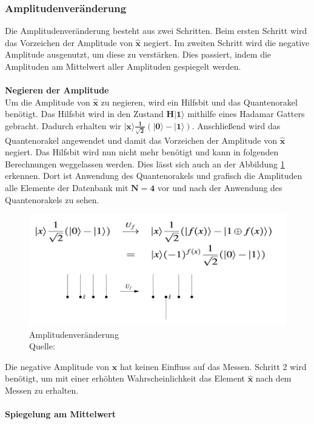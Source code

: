 \subsubsection{Amplitudenveränderung}
Die Amplitudenveränderung besteht aus zwei Schritten. Beim ersten Schritt wird das Vorzeichen der Amplitude von $\mathbf{\hat x}$ negiert. Im zweiten Schritt wird die negative Amplitude ausgenutzt, um diese zu verstärken. Dies passiert, indem die Amplituden am Mittelwert aller Amplituden gespiegelt werden. 
\\ \\
\textbf{Negieren der Amplitude}
\\
Um die Amplitude von $\mathbf{\hat x}$ zu negieren, wird ein Hilfsbit und das Quantenorakel benötigt. Das Hilfsbit wird in den Zustand $\mathbf{H|1\rangle}$ mithilfe eines Hadamar Gatters gebracht. Dadurch erhalten wir $\mathbf{|x\rangle \frac{1}{\sqrt 2}(|0\rangle - |1\rangle )}$. Anschließend wird das Quantenorakel angewendet und damit das Vorzeichen der Amplitude von $\mathbf{\hat{x}}$ negiert. Das Hilfsbit wird nun nicht mehr benötigt und kann in folgenden Berechnungen weggelassen werden. Dies lässt sich auch an der Abbildung \ref{fig:changeAmplitude} erkennen. Dort ist Anwendung des Quantenorakels und grafisch die Amplituden alle Elemente der Datenbank mit $\mathbf{N=4}$ vor und nach der Anwendung des Quantenorakels zu sehen.
\begin{figure}[hbtp]
	\centering
	\includegraphics[width=.8\textwidth]{figures/amplitudenveraenderung.png}
	\caption{Amplitudenveränderung \\ Quelle: \cite[S. 141]{Homeister.2018}}
	\label{fig:changeAmplitude}
\end{figure}
Die negative Amplitude von $\mathbf{\hat x}$ hat keinen Einfluss auf das Messen. Schritt 2 wird benötigt, um mit einer erhöhten Wahrscheinlichkeit das Element $\mathbf{\hat x}$ nach dem Messen zu erhalten.
\\\\
\textbf{Spiegelung am Mittelwert} \\
\label{sec:spiegelnAmMittelwert} 
